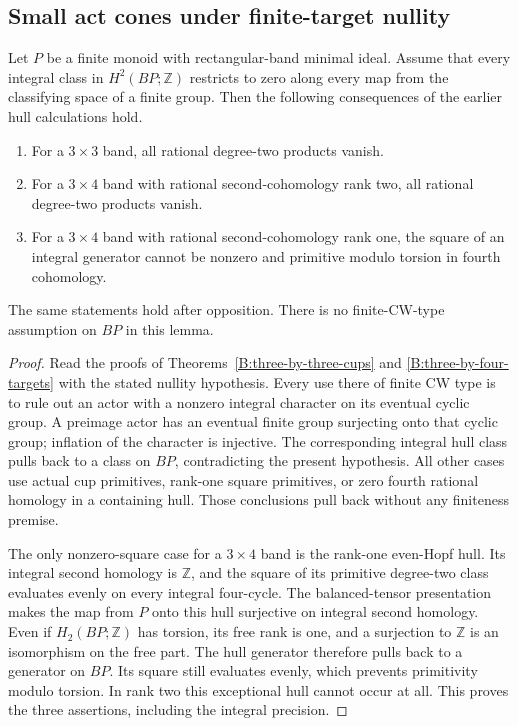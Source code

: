 \subsection{Small act cones under finite-target nullity}

\begin{lemma}
\label{C:small-band-finite-target-cups}
Let $P$ be a finite monoid with rectangular-band minimal ideal.
Assume that every integral class in $H^2(BP;\mathbb Z)$ restricts
to zero along every map from the classifying space of a finite group.
Then the following consequences of the earlier hull calculations hold.
\begin{enumerate}
\item For a $3\times3$ band, all rational degree-two products vanish.
\item For a $3\times4$ band with rational second-cohomology rank two,
all rational degree-two products vanish.
\item For a $3\times4$ band with rational second-cohomology rank one,
the square of an integral generator cannot be nonzero and primitive modulo torsion
in fourth cohomology.
\end{enumerate}
The same statements hold after opposition. There is no finite-CW-type
assumption on $BP$ in this lemma.
\end{lemma}
\begin{proof}
Read the proofs of Theorems~\ref{B:three-by-three-cups} and
\ref{B:three-by-four-targets} with the stated nullity hypothesis.
Every use there of finite CW type is to rule out an actor with a
nonzero integral character on its eventual cyclic group. A preimage
actor has an eventual finite group surjecting onto that cyclic group;
inflation of the character is injective. The corresponding integral
hull class pulls back to a class on $BP$, contradicting the present
hypothesis. All other cases use actual cup primitives, rank-one
square primitives, or zero fourth rational homology in a containing
hull. Those conclusions pull back without any finiteness premise.

The only nonzero-square case for a $3\times4$ band is the rank-one
even-Hopf hull. Its integral second homology is $\mathbb Z$, and the
square of its primitive degree-two class evaluates evenly on every
integral four-cycle. The balanced-tensor presentation makes the map
from $P$ onto this hull surjective on integral second homology.
Even if $H_2(BP;\mathbb Z)$ has torsion, its free rank is one,
and a surjection to $\mathbb Z$ is an isomorphism on the free part.
The hull generator therefore pulls back to a generator on $BP$.
Its square still evaluates evenly, which prevents primitivity modulo
torsion. In rank two this exceptional hull cannot occur at all.
This proves the three assertions, including the integral precision.
\end{proof}

